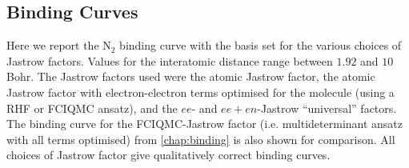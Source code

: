 \subsection{Binding Curves}

Here we report the N$_2$ binding curve with the \avtz basis set for the various choices of Jastrow factors. Values for the interatomic distance range between $1.92$ and $10$ Bohr. The Jastrow factors used were the atomic Jastrow factor, the atomic Jastrow factor with electron-electron terms optimised for the molecule (using a RHF or FCIQMC ansatz), and the $ee$- and $ee+en$-Jastrow ``universal'' factors.  The binding curve for the FCIQMC-Jastrow factor (i.e. multideterminant ansatz with all terms optimised) from \autoref{chap:binding} is also shown for comparison. All choices of Jastrow factor give qualitatively correct binding curves.


